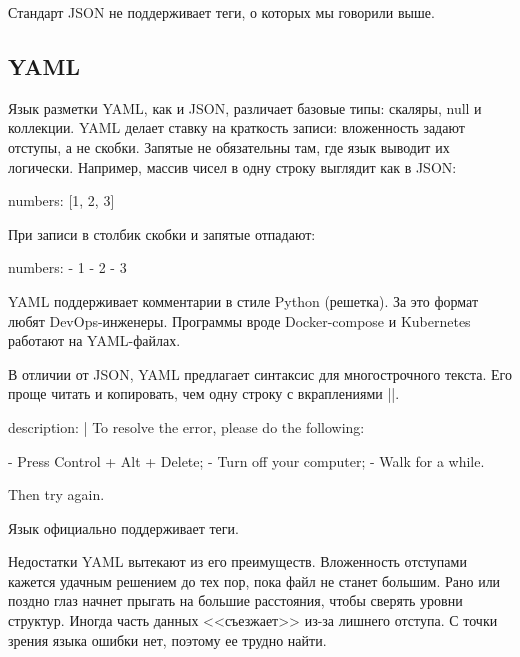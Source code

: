 Стандарт JSON не поддерживает теги, о которых мы говорили выше.

\subsection{YAML}

Язык разметки YAML, как и JSON, различает базовые типы: скаляры, null и
коллекции. YAML делает ставку на краткость записи: вложенность задают отступы, а
не скобки. Запятые не обязательны там, где язык выводит их логически. Например,
массив чисел в одну строку выглядит как в JSON:

\begin{english}
  \begin{yaml}
numbers: [1, 2, 3]
  \end{yaml}
\end{english}

При записи в столбик скобки и запятые отпадают:

\begin{english}
  \begin{yaml}
numbers:
  - 1
  - 2
  - 3
  \end{yaml}
\end{english}

YAML поддерживает комментарии в стиле Python (решетка). За это формат любят
DevOps-инженеры. Программы вроде Docker-compose и Kubernetes работают на
YAML-файлах.

В отличии от JSON, YAML предлагает синтаксис для многострочного текста. Его
проще читать и копировать, чем одну строку с вкраплениями \spverb|\n|.

\begin{english}
  \begin{yaml}
description: |
  To resolve the error, please do the following:

  - Press Control + Alt + Delete;
  - Turn off your computer;
  - Walk for a while.

  Then try again.
  \end{yaml}
\end{english}

Язык официально поддерживает теги.

Недостатки YAML вытекают из его преимуществ. Вложенность отступами кажется
удачным решением до тех пор, пока файл не станет большим. Рано или поздно глаз
начнет прыгать на большие расстояния, чтобы сверять уровни структур. Иногда
часть данных <<съезжает>> из-за лишнего отступа. С точки зрения языка ошибки
нет, поэтому ее трудно найти.

